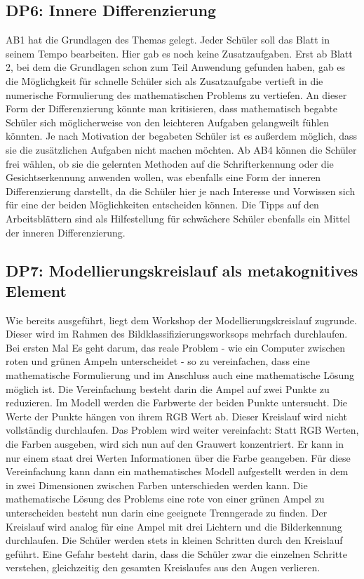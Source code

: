         \subsection{DP6: Innere Differenzierung}
            AB1 hat die Grundlagen des Themas gelegt. Jeder Schüler soll das Blatt in seinem Tempo bearbeiten. Hier gab es noch keine Zusatzaufgaben.
            Erst ab Blatt 2, bei dem die Grundlagen schon zum Teil Anwendung gefunden haben, gab es die Möglichgkeit für schnelle Schüler sich als Zusatzaufgabe vertieft in die numerische Formulierung des mathematischen Problems zu vertiefen.
            An dieser Form der Differenzierung könnte man kritisieren, dass mathematisch begabte Schüler sich möglicherweise von den leichteren Aufgaben gelangweilt fühlen könnten. Je nach Motivation der begabeten Schüler ist es außerdem möglich, dass sie die zusätzlichen Aufgaben nicht machen möchten. 
            Ab AB4 können die Schüler frei wählen, ob sie die gelernten Methoden auf die Schrifterkennung oder die Gesichtserkennung anwenden wollen, was ebenfalls eine Form der inneren Differenzierung darstellt, da die Schüler hier je nach Interesse und Vorwissen sich für eine der beiden Möglichkeiten entscheiden können.
            Die Tipps auf den Arbeitsblättern sind als Hilfestellung für schwächere Schüler ebenfalls ein Mittel der inneren Differenzierung.
        \subsection{DP7: Modellierungskreislauf als metakognitives Element}
        
            Wie bereits ausgeführt, liegt dem Workshop der Modellierungskreislauf zugrunde. Dieser wird im Rahmen des Bildklassifizierungsworksops mehrfach durchlaufen. Bei ersten Mal Es geht darum, das reale Problem - wie ein Computer zwischen roten und grünen Ampeln unterscheidet - so zu vereinfachen, dass eine mathematische Formulierung und im Anschluss auch eine mathematische Lösung möglich ist. Die Vereinfachung besteht darin die Ampel auf zwei Punkte zu reduzieren. Im Modell werden die Farbwerte der  beiden Punkte untersucht. Die Werte der Punkte hängen von ihrem RGB Wert ab.
            Dieser Kreislauf wird nicht vollständig durchlaufen. Das Problem wird weiter vereinfacht: Statt RGB Werten, die Farben ausgeben, wird sich nun auf den Grauwert konzentriert. Er kann in nur einem staat drei Werten Informationen über die Farbe geangeben. Für diese Vereinfachung kann dann ein mathematisches Modell aufgestellt werden in dem in zwei Dimensionen zwischen Farben unterschieden werden kann. Die mathematische Lösung des Problems eine rote von einer grünen Ampel zu unterscheiden besteht nun darin eine geeignete Trenngerade zu finden. 
            Der Kreislauf wird analog für eine Ampel mit drei Lichtern und die Bilderkennung durchlaufen.
            Die Schüler werden stets in kleinen Schritten durch den Kreislauf geführt. Eine Gefahr besteht darin, dass die Schüler zwar die einzelnen Schritte verstehen, gleichzeitig den gesamten Kreislaufes aus den Augen verlieren.      



